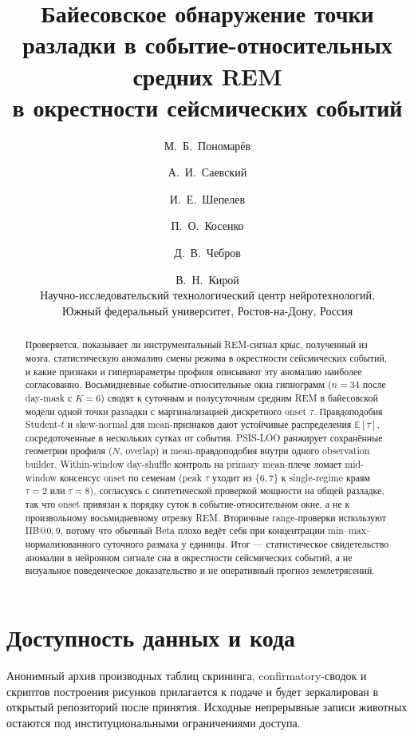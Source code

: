 \documentclass[10pt,twocolumn]{article}
\title{Байесовское обнаружение точки разладки в событие-относительных средних REM\\
в окрестности сейсмических событий}
\author{%
  М.~Б.~Пономарёв \and
  А.~И.~Саевский \and
  И.~Е.~Шепелев \and
  П.~О.~Косенко \and
  Д.~В.~Чебров \and
  В.~Н.~Кирой \\
  \small Научно-исследовательский технологический центр нейротехнологий,\\
  \small Южный федеральный университет, Ростов-на-Дону, Россия
}
\begin{document}
\maketitle

\begin{abstract}
Проверяется, показывает ли инструментальный REM-сигнал крыс, полученный из мозга, статистическую аномалию смены режима в окрестности сейсмических событий, и какие признаки и гиперпараметры профиля описывают эту аномалию наиболее согласованно. Восьмидневные событие-относительные окна гипнограмм (\(n=34\) после day-mask с \(K=6\)) сводят к суточным и полусуточным средним REM в байесовской модели одной точки разладки с маргинализацией дискретного onset \(\tau\). Правдоподобия Student-\(t\) и skew-normal для mean-признаков дают устойчивые распределения \(\mathbb{E}[\tau]\), сосредоточенные в нескольких сутках от события. PSIS-LOO ранжирует сохранённые геометрии профиля (\(N\), overlap) и mean-правдоподобия внутри одного observation builder. Within-window day-shuffle контроль на primary mean-плече ломает mid-window консенсус onset по семенам (peak \(\tau\) уходит из \(\{6,7\}\) к single-regime краям \(\tau=2\) или \(\tau=8\)), согласуясь с синтетической проверкой мощности на общей разладке, так что onset привязан к порядку суток в событие-относительном окне, а не к произвольному восьмидневному отрезку REM. Вторичные range-проверки используют IIB@\(0{,}9\), потому что обычный Beta плохо ведёт себя при концентрации min–max–нормализованного суточного размаха у единицы. Итог --- статистическое свидетельство аномалии в нейронном сигнале сна в окрестности сейсмических событий, а не визуальное поведенческое доказательство и не оперативный прогноз землетрясений.
\end{abstract}



\section*{Доступность данных и кода}
Анонимный архив производных таблиц скрининга, confirmatory-сводок и скриптов построения рисунков прилагается к подаче и будет зеркалирован в открытый репозиторий после принятия. Исходные непрерывные записи животных остаются под институциональными ограничениями доступа.



\end{document}

